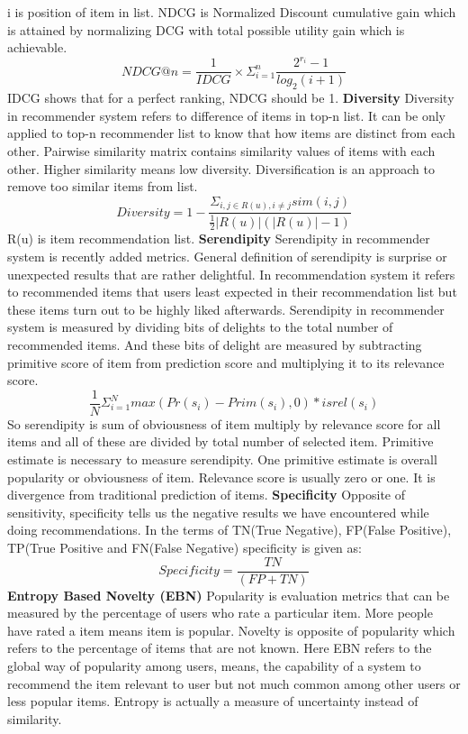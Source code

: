     i is position of item in list. 
NDCG is Normalized Discount cumulative gain which is attained by normalizing DCG with total possible utility gain which is achievable\cite{p4-8}. 
\[NDCG@n = \frac{1}{IDCG} \times \Sigma_{i=1}^n \frac{2^{r_i}-1}{log_2 (i+1)}\]
IDCG shows that for a perfect ranking, NDCG should be 1.
\newline
\textbf{Diversity}
Diversity in recommender system refers to difference of items in top-n list. It can be only applied to top-n recommender list to know that how items are distinct from each other. Pairwise similarity matrix contains similarity values of items with each other. Higher similarity means low diversity. Diversification is an approach to remove too similar items from list\cite{p6-3}\cite{p4-8}.
\[Diversity = 1 - \frac{\Sigma_{i,j\in R(u),i\neq j} sim(i,j)}{\frac{1}{2} |R(u)| (|R(u)|-1) }\]
R(u) is item recommendation  list.
\newline
\textbf{Serendipity}
Serendipity in recommender system is recently added metrics. General definition of serendipity is surprise or unexpected results that are rather delightful. In recommendation system it refers to recommended items that users least expected in their recommendation list but these items turn out to be highly liked afterwards. Serendipity in recommender system is measured by dividing bits of delights to the total number of recommended items. And these bits of delight are measured by subtracting primitive score of item from prediction score and multiplying it to its relevance score.
\[\frac{1}{N}\Sigma_{i=1}^N max(Pr(s_i)-Prim(s_i), 0) * isrel(s_i)\]
So serendipity is sum of obviousness of item multiply by relevance score for all items and all of these are divided by total number of selected item. Primitive estimate is necessary to measure serendipity. One primitive estimate is overall popularity or obviousness of item. Relevance score is usually zero or one. It is divergence from traditional prediction of items\cite{Metrics5}.
\newline
\textbf{Specificity}
Opposite of sensitivity, specificity tells us the negative results we have encountered while doing recommendations. In the terms of TN(True Negative), FP(False Positive), TP(True Positive and FN(False Negative) specificity is given as:
\[Specificity = \frac{TN}{(FP+TN)}\]
\newline
\textbf{Entropy Based Novelty (EBN)}
Popularity is evaluation metrics that can be measured by the percentage of users who rate a particular item. More people have rated a item means item is popular. Novelty is opposite of popularity which refers to the percentage of items that are not known\cite{Metrics5}. Here EBN refers to the global way of popularity among users, means, the capability of a system to recommend the item relevant to user but not much common among other users or less popular items. Entropy is actually a measure of uncertainty instead of similarity.  
